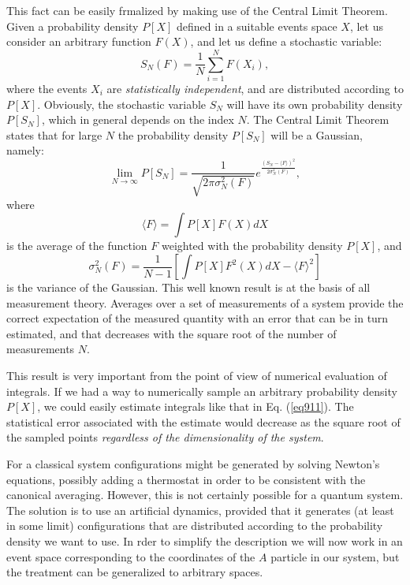 This fact can be easily frmalized by making use of the Central Limit Theorem. Given a probability density $P[X]$ defined in a suitable events space $X$, let us consider an arbitrary function $F(X)$, and let us define a stochastic variable:
\begin{equation}
S_N(F)=\frac{1}{N}\sum_{i=1}^{N}F(X_i),
\end{equation}
where the events $X_i$ are {\it statistically independent}, and are distributed according to $P[X]$. Obviously, the stochastic variable $S_N$ will have its own probability density $P[S_N]$, which in general depends on the index $N$. The Central Limit Theorem states that for large $N$ the probability density $P[S_N]$ will be a Gaussian, namely:
\begin{equation}
\lim_{N\rightarrow \infty} P[S_N]=\frac{1}{\sqrt{2\pi\sigma^2_N(F)}}e^{\frac{(S_N-\langle F\rangle)^2}{2\sigma^2_N(F)}},
\end{equation}
where
\begin{equation}
\langle F\rangle=\int P[X]F(X)dX
\end{equation}
is the average of the function $F$ weighted with the probability density $P[X]$, and
\begin{equation}
\sigma^2_N(F)=\frac{1}{N-1}\left[\int P[X]F^2(X)dX-\langle F\rangle^2\right]
\end{equation}
is the variance of the Gaussian. This well known result is at the basis of all measurement theory. Averages over a set of measurements of a system provide the correct expectation of the measured quantity with an error that can be in turn estimated, and that decreases with the square root of the number of measurements $N$. 

This result is very important from the point of view of numerical evaluation of integrals. If we had a way to numerically sample an arbitrary probability density $P[X]$, we could easily estimate integrals like that in Eq. (\ref{eq911}). The statistical error associated with the estimate would decrease as the square root of the sampled points {\it regardless of the dimensionality of the system}. 

For a classical system configurations might be generated by solving Newton's equations, possibly adding a thermostat in order to be consistent with the canonical averaging. However, this is not certainly possible for a quantum system. The solution is to use an artificial dynamics, provided that it generates (at least in some limit) configurations that are distributed according to the probability density we want to use. In rder to simplify the description we will now work in an event space corresponding to the coordinates of the $A$ particle in our system, but the treatment can be generalized to arbitrary spaces.

